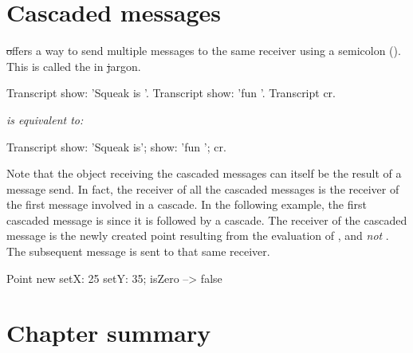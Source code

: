 \documentclass[a4paper,10pt,twoside]{book}
\begin{document}
\section{Cascaded messages}
\st offers a way to send multiple messages to the same receiver using a semicolon (\ct{;}).
This is called the  in \st jargon.


\begin{minipage}{0.35\textwidth}
\begin{code}{}
Transcript show: 'Squeak is '.
Transcript show: 'fun '.
Transcript cr.
\end{code}
\end{minipage}
\emph{is equivalent to:}
\begin{minipage}{0.35\textwidth}
\begin{code}{}
Transcript        
   show: 'Squeak is';
   show: 'fun ';
   cr.
\end{code}
\end{minipage}

Note that the object receiving the cascaded messages can itself be the result of a message send. 
In fact, the receiver of all the cascaded messages is the receiver of the first message involved in a cascade.
In the following example, the first cascaded message is  since it is followed by a cascade.
The receiver of the cascaded message  is the newly created point resulting from the evaluation of , and \emph{not} .
The subsequent message  is sent to that same receiver.

\begin{code}{}
Point new setX: 25 setY: 35; isZero --> false
\end{code}

\section{Chapter summary}
\end{document}
